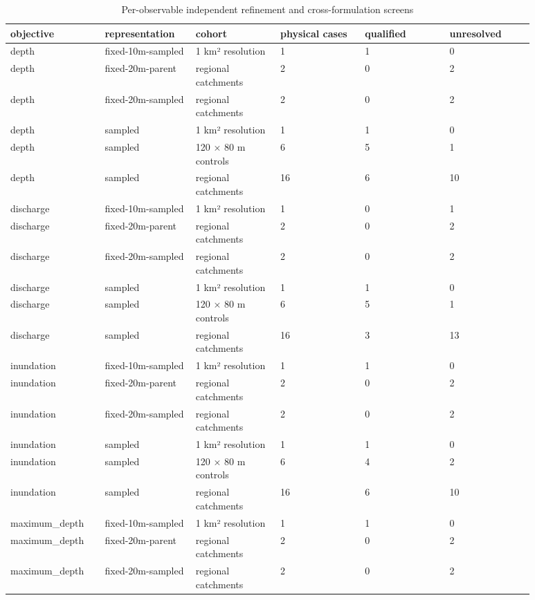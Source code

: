 \begingroup
\small
\setlength{\tabcolsep}{2pt}
\begin{longtable}{p{0.1467\linewidth}p{0.1467\linewidth}p{0.1467\linewidth}p{0.1467\linewidth}p{0.1467\linewidth}p{0.1467\linewidth}}
\caption{Per-observable independent refinement and cross-formulation screens}\\
\hline
objective & representation & cohort & physical cases & qualified & unresolved \\
\hline\endhead
depth & fixed-10m-sampled & 1 km² resolution & 1 & 1 & 0 \\
depth & fixed-20m-parent & regional catchments & 2 & 0 & 2 \\
depth & fixed-20m-sampled & regional catchments & 2 & 0 & 2 \\
depth & sampled & 1 km² resolution & 1 & 1 & 0 \\
depth & sampled & 120 × 80 m controls & 6 & 5 & 1 \\
depth & sampled & regional catchments & 16 & 6 & 10 \\
discharge & fixed-10m-sampled & 1 km² resolution & 1 & 0 & 1 \\
discharge & fixed-20m-parent & regional catchments & 2 & 0 & 2 \\
discharge & fixed-20m-sampled & regional catchments & 2 & 0 & 2 \\
discharge & sampled & 1 km² resolution & 1 & 1 & 0 \\
discharge & sampled & 120 × 80 m controls & 6 & 5 & 1 \\
discharge & sampled & regional catchments & 16 & 3 & 13 \\
inundation & fixed-10m-sampled & 1 km² resolution & 1 & 1 & 0 \\
inundation & fixed-20m-parent & regional catchments & 2 & 0 & 2 \\
inundation & fixed-20m-sampled & regional catchments & 2 & 0 & 2 \\
inundation & sampled & 1 km² resolution & 1 & 1 & 0 \\
inundation & sampled & 120 × 80 m controls & 6 & 4 & 2 \\
inundation & sampled & regional catchments & 16 & 6 & 10 \\
maximum\_depth & fixed-10m-sampled & 1 km² resolution & 1 & 1 & 0 \\
maximum\_depth & fixed-20m-parent & regional catchments & 2 & 0 & 2 \\
maximum\_depth & fixed-20m-sampled & regional catchments & 2 & 0 & 2 \\

\end{longtable}
